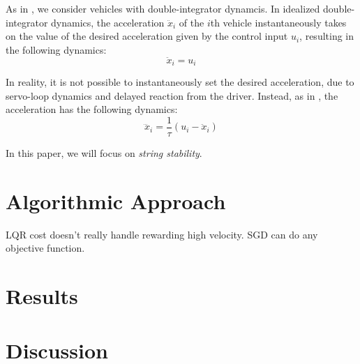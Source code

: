\documentclass[11pt]{article}
\newcommand{\mb}{\mathbf}
\begin{document}
\begin{multicols}{2}
As in \cite{Peng}, we consider vehicles with double-integrator dynamcis. In idealized double-integrator dynamics, the acceleration $\ddot{x}_i$ of the $i$th vehicle instantaneously takes on the value of the desired acceleration given by the control input $u_i$, resulting in the following dynamics:
\[\ddot{x}_i = u_i\]

In reality, it is not possible to instantaneously set the desired acceleration, due to servo-loop dynamics and delayed reaction from the driver. Instead, as in \cite{Peng}, the acceleration has the following dynamics:
\[\dddot{x}_i = \frac{1}{\tau}(u_i - \ddot{x}_i)\]

In this paper, we will focus on {\em string stability}.

\section{Algorithmic Approach}

LQR cost doesn't really handle rewarding high velocity. SGD can do any objective function.

\section{Results}

\section{Discussion}  


\end{multicols}
\end{document}
